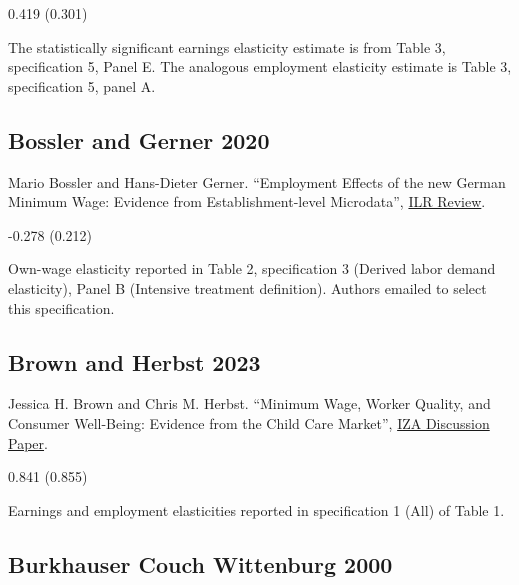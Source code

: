  0.419 (0.301)

\vspace{0.7em}

 The statistically significant earnings elasticity estimate is from Table 3, specification 5, Panel E. The analogous employment elasticity estimate is Table 3, specification 5, panel A.

\subsection*{Bossler and Gerner 2020}
\vspace{-0.7em}

\noindent Mario Bossler and Hans-Dieter Gerner. ``Employment Effects of the new German Minimum Wage: Evidence from Establishment-level Microdata'', \href{https://doi.org/10.1177/0019793919889635}{ILR Review}.

\vspace{0.7em}

 -0.278 (0.212)

\vspace{0.7em}

 Own-wage elasticity reported in Table 2, specification 3 (Derived labor demand elasticity), Panel B (Intensive treatment definition). Authors emailed to select this specification.

\subsection*{Brown and Herbst 2023}
\vspace{-0.7em}

\noindent Jessica H. Brown and Chris M. Herbst. ``Minimum Wage, Worker Quality, and Consumer Well-Being: Evidence from the Child Care Market'', \href{https://docs.iza.org/dp16257.pdf}{IZA Discussion Paper}.

\vspace{0.7em}

 0.841 (0.855)

\vspace{0.7em}

 Earnings and employment elasticities reported in specification 1 (All) of Table 1.

\subsection*{Burkhauser Couch Wittenburg 2000}
\vspace{-0.7em}

